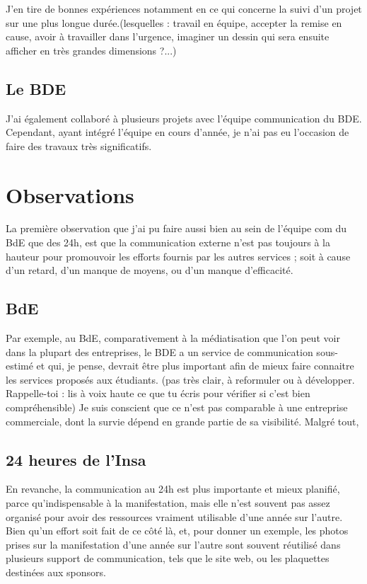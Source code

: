         J'en tire de bonnes expériences notamment en ce qui concerne la suivi d'un projet sur une plus longue durée.(lesquelles : travail en équipe, accepter la remise en cause, avoir à travailler dans l'urgence, imaginer un dessin qui sera ensuite afficher en très grandes dimensions ?...)
        
    \subsection{Le BDE}
    
        J'ai également collaboré à plusieurs projets avec l'équipe communication du BDE.
        Cependant, ayant intégré l'équipe en cours d'année, je n'ai pas eu l'occasion de faire des travaux très significatifs.

\section{Observations}

    La première observation que j'ai pu faire aussi bien au sein de l'équipe com du BdE que des 24h, est que la communication externe n'est pas toujours à la hauteur pour promouvoir les efforts fournis par les autres services ; soit à cause d'un retard, d'un manque de moyens, ou d'un manque d'efficacité.

    \subsection{BdE}

        Par exemple, au BdE, comparativement à la médiatisation que l'on peut voir dans la plupart des entreprises, le BDE  a un service de communication sous-estimé et qui, je pense, devrait être plus important afin de mieux faire connaitre les services proposés aux étudiants. (pas très clair, à reformuler ou à développer. Rappelle-toi : lis à voix haute ce que tu écris pour vérifier si c'est bien compréhensible) Je suis conscient que ce n'est pas comparable à une entreprise commerciale, dont  la survie dépend en grande partie de sa visibilité. Malgré tout, %
    
    \subsection{24 heures de l'Insa}
        
        En revanche, la communication au 24h est plus importante et mieux planifié, parce qu'indispensable à la manifestation, mais elle n'est souvent pas assez organisé pour avoir des ressources vraiment utilisable d'une année sur l'autre.
        Bien qu'un effort soit fait de ce côté là, et, pour donner un exemple, les photos prises sur la manifestation d'une année sur l'autre sont souvent réutilisé dans plusieurs support de communication, tels que le site web, ou les plaquettes destinées aux sponsors.
        
